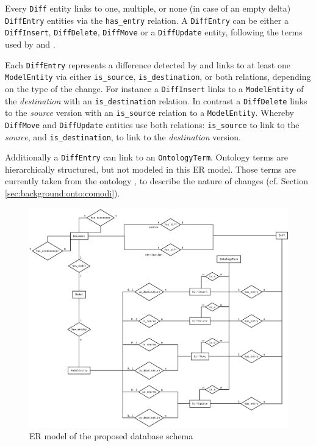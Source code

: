Every \texttt{Diff} entity links to one, multiple, or none (in case of an empty delta) \texttt{DiffEntry} entities via the \texttt{has\_entry} relation.  
A \texttt{DiffEntry} can be either a \texttt{DiffInsert},  \texttt{DiffDelete}, \texttt{DiffMove} or a \texttt{DiffUpdate} entity, following the terms used by \bives \citep{Scharm2015} and \comodi \citep{Scharm2016}.

Each \texttt{DiffEntry} represents a difference detected by \bives \citep{Scharm2015} and links to at least one \texttt{ModelEntity} via either \texttt{is\_source}, \texttt{is\_destination}, or both relations, depending on the type of the change.
For instance a \texttt{DiffInsert} links to a \texttt{ModelEntity} of the \emph{destination} with an \texttt{is\_destination} relation.
In contrast a \texttt{DiffDelete} links to the \emph{source} version with an \texttt{is\_source} relation to a \texttt{ModelEntity}. Whereby \texttt{DiffMove} and \texttt{DiffUpdate} entities use both relations: \texttt{is\_source} to link to the \emph{source}, and \texttt{is\_destination}, to link to the \emph{destination} version.

Additionally a \texttt{DiffEntry} can link to an \texttt{OntologyTerm}. Ontology terms are hierarchically structured, but not modeled in this ER model. Those terms are currently taken from the \comodi ontology \citep{Scharm2016}, to describe the nature of changes (cf. Section \ref{sec:background:onto:comodi}).



\begin{figure}
	\centering
	\includegraphics[width=\textwidth]{resources/db-concept-er.pdf}
	\caption{ER model of the proposed database schema}
	\label{fig:db-er-model}
\end{figure}

